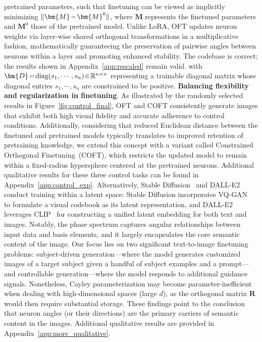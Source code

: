 \begin{itemize}[leftmargin=*,nosep]
\begin{itemize}[leftmargin=*,nosep]
{pretrained parameters, such that finetuning can be viewed as implicitly minimizing $\thickmuskip=2mu \medmuskip=2mu \| \bm{M} - \bm{M}^0\|$, where $\bm{M}$ represents the finetuned parameters and $\bm{M}^0$ those of the pretrained model. Unlike LoRA, OFT updates neuron weights via layer-wise shared orthogonal transformations in a multiplicative fashion, mathematically guaranteeing the preservation of pairwise angles between neurons within a layer and promoting enhanced stability. The codebase is correct; the results shown in Appendix~\ref{app:rescaled} remain valid.} with $\thickmuskip=2mu \medmuskip=2mu \bm{D}=\text{diag}(s_1,\cdots,s_n)\in\mathbb{R}^{n\times n}$ representing a trainable diagonal matrix whose diagonal entries $s_1,\cdots,s_n$ are constrained to be positive. \textbf{Balancing flexibility and regularization in finetuning}. As illustrated by the randomly selected results in Figure~\ref{fig:control_final}, OFT and COFT consistently generate images that exhibit both high visual fidelity and accurate adherence to control conditions. Additionally, considering that reduced Euclidean distance between the finetuned and pretrained models typically translates to improved retention of pretraining knowledge, we extend this concept with a variant called Constrained Orthogonal Finetuning~(COFT), which restricts the updated model to remain within a fixed-radius hypersphere centered at the pretrained neurons. Additional qualitative results for these three control tasks can be found in Appendix~\ref{app:control_exp}. Alternatively, Stable Diffusion~\cite{rombach2022high} and DALL-E2~\cite{ramesh2022hierarchical} conduct training within a latent space: Stable Diffusion incorporates VQ-GAN~\cite{esser2021taming} to formulate a visual codebook as its latent representation, and DALL-E2 leverages CLIP~\cite{radford2021learning} for constructing a unified latent embedding for both text and images. Notably, the phase spectrum captures angular relationships between input data and basis elements, and it largely encapsulates the core semantic content of the image. Our focus lies on two significant text-to-image finetuning problems: subject-driven generation—where the model generates customized images of a target subject given a handful of subject examples and a prompt—and controllable generation—where the model responds to additional guidance signals. Nonetheless, Cayley parameterization may become parameter-inefficient when dealing with high-dimensional spaces (large $d$), as the orthogonal matrix $\bm{R}$ would then require substantial storage. These findings point to the conclusion that neuron angles (or their directions) are the primary carriers of semantic content in the images. Additional qualitative results are provided in Appendix~\ref{app:more_qualitative}. \end{itemize}


\end{itemize}
